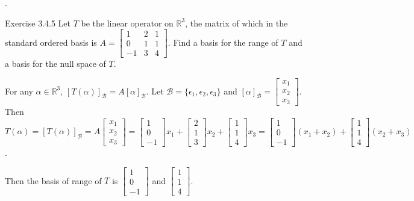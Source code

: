 \documentclass[8pt]{beamer}
\newcommand{\mbb}[1]{\mathbb{#1}}
\newcommand{\mc}[1]{\mathcal{#1}}
\begin{document}
\begin{frame}{.}
    \begin{block}{Exercise 3.4.5}
        Let $T$ be the linear operator on $\mbb{R}^3$, the matrix of which in the standard ordered basis is $A = \left[\begin{matrix}
            1 & 2&1 \\0&1&1\\-1&3&4
        \end{matrix}\right]$.
        Find a basis for the range of $T$ and a basis for the null space of $T$.
    \end{block}

    For any $\alpha \in \mbb{R}^3$, $[T(\alpha)]_{\mc{B}} = A [\alpha]_{\mc{B}}$.
    Let $\mc{B} = \{\epsilon_1, \epsilon_2, \epsilon_3\}$ and $[\alpha]_{\mc{B}} = \left[\begin{matrix}
    x_1 \\ x_2 \\ x_3
    \end{matrix}\right]$.
    Then $T(\alpha) = [T(\alpha)]_{\mc{B}} = A \left[\begin{matrix}
    x_1 \\ x_2 \\ x_3
    \end{matrix}\right] = 
    \left[\begin{matrix}
        1 \\ 0 \\ -1
    \end{matrix}\right]x_1 +
    \left[\begin{matrix}
    2 \\ 1 \\ 3
    \end{matrix}\right]x_2 +
    \left[\begin{matrix}
    1 \\ 1\\ 4
    \end{matrix}\right]x_3 =
    \left[\begin{matrix}
    1 \\ 0 \\-1
    \end{matrix}\right](x_1 + x_2) +
    \left[\begin{matrix}
    1\\1\\4
    \end{matrix}\right](x_2 + x_3)$.

    Then the basis of range of $T$ is $\left[\begin{matrix}
    1 \\ 0 \\ -1
    \end{matrix}\right]$ and $\left[\begin{matrix}
    1 \\ 1 \\ 4
    \end{matrix}\right]$.


\end{frame}
\end{document}
